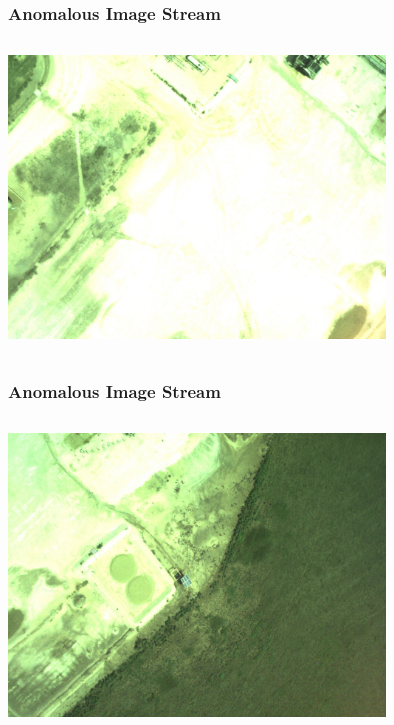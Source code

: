 \documentclass{beamer}
\begin{document}
\begin{frame} [noframenumbering]
\frametitle{Anomalous Image Stream}
\begin{columns}
\begin{centering}
\includegraphics[width = 10cm]{Figures/bad2}
\end{centering}
\end{columns}
\end{frame}


\begin{frame} [noframenumbering]
\frametitle{Anomalous Image Stream}
\begin{columns}
\begin{centering}
\includegraphics[width = 10cm]{Figures/bad3}
\end{centering}
\end{columns}
\end{frame}
\end{document}
